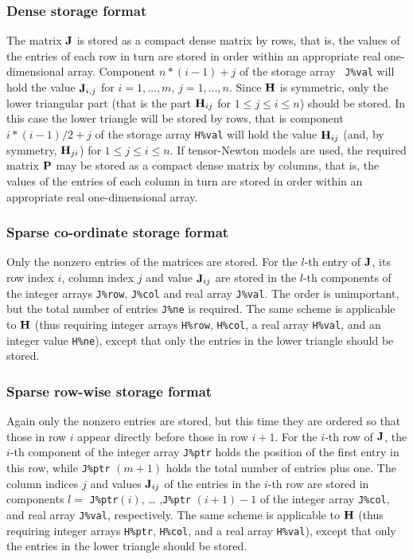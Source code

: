 \documentclass{galahad}
\begin{document}
\subsubsection{Dense storage format}\label{dense}
The matrix ${\mathbf{J}}$ is stored as a compact
dense matrix by rows, that is, the values of the entries of each row in turn are
stored in order within an appropriate real one-dimensional array.
Component $n \ast (i-1) + j$ of the storage array {\tt
  J\%val} will hold the value ${\mathbf{J}}_{i,j}$ for $i = 1, \ldots , m$, $j =
1, \ldots , n$.  Since ${\mathbf{H}}$ is symmetric, only the lower triangular
part (that is the part ${\mathbf{H}}_{ij}$ for $1 \leq j \leq i \leq n$)
should be stored. In this case the lower triangle will be stored by rows,
that is component $i \ast (i-1)/2 + j$ of the storage array {\tt H\%val} will
hold the value ${\mathbf{H}}_{ij}$ (and, by symmetry, ${\mathbf{H}}_{ji}$) for $1 \leq j
\leq i \leq n$. If tensor-Newton models are used, the required matrix ${\mathbf{P}}$
may be stored as a compact dense matrix by columns, that is, the values of
the entries of each column in turn are stored in order within an appropriate
real one-dimensional array.

\subsubsection{Sparse co-ordinate storage format}\label{coordinate}
Only the nonzero entries of the matrices are stored. For the $l$-th
entry of ${\mathbf{J}}$, its row index $i$, column index $j$ and value
${\mathbf{J}}_{ij}$ are stored in the $l$-th components of the integer arrays
{\tt J\%row}, {\tt J\%col} and real array {\tt J\%val}.
The order is unimportant, but the total number of entries {\tt J\%ne} is
required.  The same scheme is applicable to ${\mathbf{H}}$
(thus requiring integer arrays {\tt H\%row}, {\tt H\%col}, a real
array {\tt H\%val}, and an integer value {\tt H\%ne}), except that only
the entries in the lower triangle should be stored.


\subsubsection{Sparse row-wise storage format}\label{rowwise}
Again only the nonzero entries are stored, but this time they are
ordered so that those in row $i$ appear directly before those in row
$i+1$. For the $i$-th row of ${\mathbf{J}}$, the $i$-th component of the integer
array {\tt J\%ptr} holds the position of the first entry in this row,
while {\tt J\%ptr} $(m+1)$ holds the total number of entries plus one.
The column indices $j$ and values ${\mathbf{J}}_{ij}$ of the entries in the
$i$-th row are stored in components $l =$ {\tt J\%ptr}$(i)$, \ldots
,{\tt J\%ptr} $(i+1)-1$ of the integer array {\tt J\%col}, and real
array {\tt J\%val}, respectively.
The same scheme is applicable to
${\mathbf{H}}$ (thus requiring integer arrays {\tt H\%ptr}, {\tt H\%col}, and
a real array {\tt H\%val}),
except that only the entries in the lower triangle should be stored.
\end{document}
